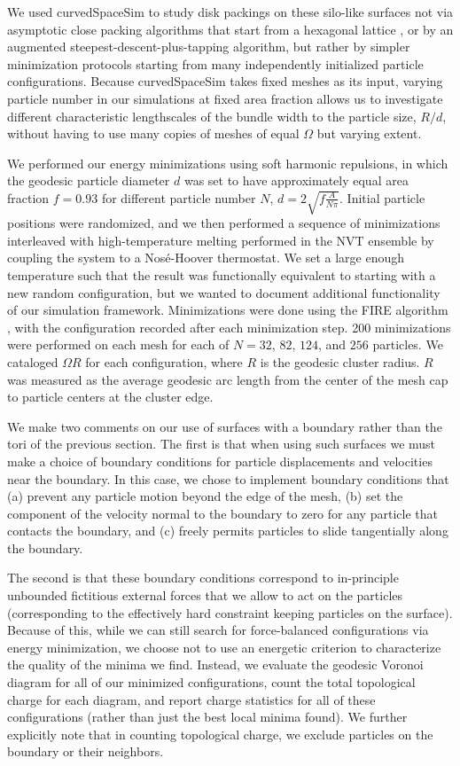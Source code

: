 \documentclass[preprint,12pt]{elsarticle}
\begin{document}
We used curvedSpaceSim to study disk packings on these silo-like surfaces not via asymptotic close packing algorithms that start from a hexagonal lattice \cite{bruss2012non}, or by an augmented steepest-descent-plus-tapping algorithm, but rather by simpler minimization protocols starting from many independently initialized particle configurations. Because curvedSpaceSim takes fixed meshes as its input, varying particle number in our simulations at fixed area fraction allows us to investigate different characteristic lengthscales of the bundle width to the particle size, $R/d$, without having to use many copies of meshes of equal $\Omega$ but varying extent.

We performed our energy minimizations using soft harmonic repulsions, in which the geodesic particle diameter $d$ was set to have approximately equal area fraction $f=0.93$ for different particle number $N$, $d = 2\sqrt{f\frac{A}{N\pi}}$.
Initial particle positions were randomized, and we then performed a sequence of minimizations interleaved with high-temperature melting performed in the NVT ensemble by coupling the system to a Nos\'e-Hoover thermostat.
We set a large enough temperature such that the result was functionally equivalent to starting with a new random configuration, but we wanted to document additional functionality of our simulation framework.
Minimizations were done using the FIRE algorithm \cite{bitzek2006structural}, with the configuration recorded after each minimization step. 200 minimizations were performed on each mesh for each of $N=32$, $82$, $124$, and $256$ particles.
We cataloged $\Omega R$ for each configuration, where $R$ is the geodesic cluster radius.
$R$ was measured as the average geodesic arc length from the center of the mesh cap to particle centers at the cluster edge.

We make two comments on our use of surfaces with a boundary rather than the tori of the previous section. The first is that when using such surfaces we must make a choice of boundary conditions for particle displacements and velocities near the boundary.
In this case, we chose to implement boundary conditions that (a) prevent any particle motion beyond the edge of the mesh, (b) set the component of the velocity normal to the boundary to zero for any particle that contacts the boundary, and (c) freely permits particles to slide tangentially along the boundary.

The second is that these boundary conditions correspond to in-principle unbounded fictitious external forces that we allow to act on the particles (corresponding to the effectively hard constraint keeping particles on the surface). Because of this, while we can still search for force-balanced configurations via energy minimization, we choose not to use an energetic criterion to characterize the quality of the minima we find.
Instead, we evaluate the geodesic Voronoi diagram for all of our minimized configurations, count the total topological charge for each diagram, and report charge statistics for all of these configurations (rather than just the best local minima found).
We further explicitly note that in counting topological charge, we exclude particles on the boundary or their neighbors.
\end{document}
